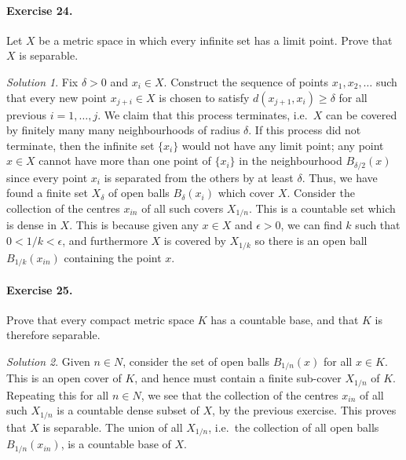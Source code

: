\documentclass[11pt]{report}
\theoremstyle{remark}
\newtheorem*{solution}{Solution}
\begin{document}
    \paragraph{Exercise 24.} Let $X$ be a metric space in which every infinite set
    has a limit point. Prove that $X$ is separable.
    \begin{solution}
        Fix $\delta > 0$ and $x_i \in X$. Construct the sequence of points $x_1,
        x_2, \dots$ such that every new point $x_{j + i} \in X$ is chosen to satisfy
        $d(x_{j + 1}, x_i) \geq \delta$ for all previous $i = 1, \dots, j$. We claim
        that this process terminates, i.e.\ $X$ can be covered by finitely many many
        neighbourhoods of radius $\delta$. If this process did not terminate, then
        the infinite set $\{x_i\}$ would not have any limit point; any point $x \in
        X$ cannot have more than one point of $\{x_i\}$ in the neighbourhood
        $B_{\delta / 2}(x)$ since every point $x_i$ is separated from the others by
        at least $\delta$. Thus, we have found a finite set $X_\delta$ of open balls
        $B_\delta(x_i)$ which cover $X$. Consider the collection of the centres
        $x_{in}$ of all such covers $X_{1 / n}$. This is a countable set which is
        dense in $X$. This is because given any $x \in X$ and $\epsilon > 0$, we can
        find $k$ such that $0 < 1 /k < \epsilon$, and furthermore $X$ is covered by
        $X_{1 / k}$ so there is an open ball $B_{1 / k}(x_{in})$ containing the
        point $x$.
    \end{solution}

    \paragraph{Exercise 25.} Prove that every compact metric space $K$ has a
    countable base, and that $K$ is therefore separable.
    \begin{solution}
        Given $n \in N$, consider the set of open balls $B_{1 / n}(x)$ for all $x
        \in K$. This is an open cover of $K$, and hence must contain a finite
        sub-cover $X_{1 / n}$ of $K$. Repeating this for all $n \in N$, we see that
        the collection of the centres $x_{in}$ of all such $X_{1 / n}$ is a
        countable dense subset of $X$, by the previous exercise. This proves that
        $X$ is separable. The union of all $X_{1 / n}$, i.e.\ the collection of all
        open balls $B_{1 / n}(x_{in})$, is a countable base of $X$.
    \end{solution}
\end{document}
